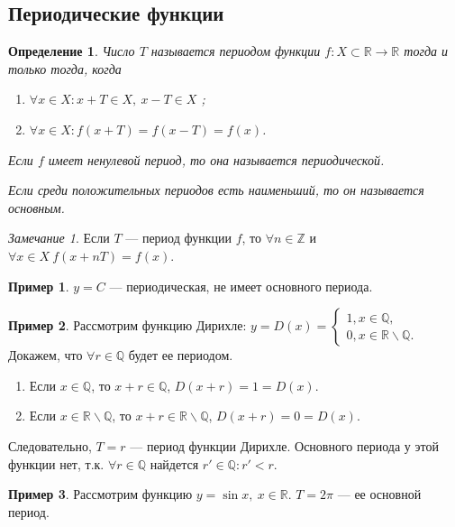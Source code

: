 \documentclass[a4paper,12pt]{article} %
\newtheorem{definition}{Определение}[section]
\theoremstyle{remark}
\newtheorem{remark}{Замечание}[theorem]
\theoremstyle{definition}
\newtheorem{exmp}{Пример}[section]
\begin{document}
\subsection{Периодические функции}
\begin{definition}
    Число $T$ называется периодом функции $f : X\subset \mathbb{R} \to \mathbb{R}$ тогда и только тогда, когда
    \begin{enumerate}
        \item $\forall x \in X : x + T \in X, \ x - T \in X$ ;
        \item $\forall x \in X : f(x+T) = f(x-T) = f(x)$.
    \end{enumerate}

    Если $f$ имеет ненулевой период, то она называется периодической.

    Если среди положительных периодов есть наименьший, то он называется основным.
\end{definition}
\begin{remark}
    Если $T$ --- период функции $f$, то $\forall n\in \mathbb{Z}$ и $\forall x \in X \ f(x+nT) = f(x)$.
\end{remark}
\begin{exmp}
    $y = C$ --- периодическая, не имеет основного периода.
\end{exmp}
\begin{exmp}
    Рассмотрим функцию Дирихле: $y = D(x) = \begin{cases}
        1, x\in \mathbb{Q}, \\
        0, x \in \mathbb{R} \backslash \mathbb{Q}.
    \end{cases}$
    Докажем, что $\forall r \in \mathbb{Q}$ будет ее периодом.
    \begin{enumerate}
        \item Если $x\in \mathbb{Q}$, то $x + r \in \mathbb{Q}$, $D(x + r) = 1 = D(x)$.
        \item Если $x \in \mathbb{R}\backslash \mathbb{Q}$, то $x + r \in \mathbb{R}\backslash \mathbb{Q}$, 
            $D(x+r) = 0 = D(x)$.
    \end{enumerate}
    Следовательно, $T = r$ --- период функции Дирихле. Основного периода у этой функции нет,
    т.к. $\forall r\in \mathbb{Q}$ найдется $r'\in \mathbb{Q} : r' < r$.
\end{exmp}
\begin{exmp}
    Рассмотрим функцию $y = \sin x, \ x \in \mathbb{R}$. $T= 2\pi$ --- ее основной период.
\end{exmp}
\end{document}
